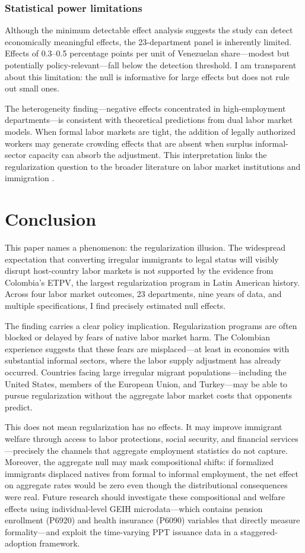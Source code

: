 \documentclass[12pt]{article}
\begin{document}
\subsubsection*{Statistical power limitations} Although the minimum detectable effect analysis suggests the study can detect economically meaningful effects, the 23-department panel is inherently limited. Effects of 0.3--0.5 percentage points per unit of Venezuelan share---modest but potentially policy-relevant---fall below the detection threshold. I am transparent about this limitation: the null is informative for large effects but does not rule out small ones.

The heterogeneity finding---negative effects concentrated in high-employment departments---is consistent with theoretical predictions from dual labor market models. When formal labor markets are tight, the addition of legally authorized workers may generate crowding effects that are absent when surplus informal-sector capacity can absorb the adjustment. This interpretation links the regularization question to the broader literature on labor market institutions and immigration \citep{meghir2015wages, boeri2012immigration}.

\section{Conclusion}

This paper names a phenomenon: the regularization illusion. The widespread expectation that converting irregular immigrants to legal status will visibly disrupt host-country labor markets is not supported by the evidence from Colombia's ETPV, the largest regularization program in Latin American history. Across four labor market outcomes, 23 departments, nine years of data, and multiple specifications, I find precisely estimated null effects.

The finding carries a clear policy implication. Regularization programs are often blocked or delayed by fears of native labor market harm. The Colombian experience suggests that these fears are misplaced---at least in economies with substantial informal sectors, where the labor supply adjustment has already occurred. Countries facing large irregular migrant populations---including the United States, members of the European Union, and Turkey---may be able to pursue regularization without the aggregate labor market costs that opponents predict.

This does not mean regularization has no effects. It may improve immigrant welfare through access to labor protections, social security, and financial services---precisely the channels that aggregate employment statistics do not capture. Moreover, the aggregate null may mask compositional shifts: if formalized immigrants displaced natives from formal to informal employment, the net effect on aggregate rates would be zero even though the distributional consequences were real. Future research should investigate these compositional and welfare effects using individual-level GEIH microdata---which contains pension enrollment (P6920) and health insurance (P6090) variables that directly measure formality---and exploit the time-varying PPT issuance data in a staggered-adoption framework.
\end{document}
